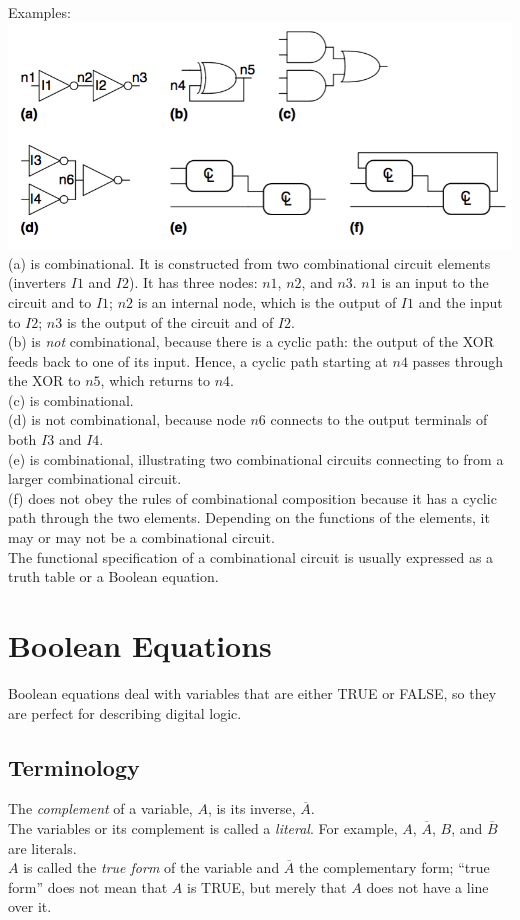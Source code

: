 \documentclass[12pt]{article}
\theoremstyle{definition}
\begin{document}
  Examples: \\
  \includegraphics{pictures/combinationalCircuitExample.png}
  (a) is combinational. It is constructed from two combinational circuit elements (inverters $I1$ and $I2$). It has three nodes: $n1$, $n2$, and $n3$. $n1$ is an input to the circuit and to $I1$; $n2$ is an internal node, which is the output of $I1$ and the input to $I2$; $n3$ is the output of the circuit and of $I2$. \\
  (b) is \emph{not} combinational, because there is a cyclic path: the output of the XOR feeds back to one of its input. Hence, a cyclic path starting at $n4$ passes through the XOR to $n5$, which returns to $n4$. \\
  (c) is combinational. \\
  (d) is not combinational, because node $n6$ connects to the output terminals of both $I3$ and $I4$. \\
  (e) is combinational, illustrating two combinational circuits connecting to from a larger combinational circuit. \\
  (f) does not obey the rules of combinational composition because it has a cyclic path through the two elements. Depending on the functions of the elements, it may or may not be a combinational circuit. \\

  The functional specification of a combinational circuit is usually expressed as a truth table or a Boolean equation.

  \newpage
  \section{Boolean Equations}
  Boolean equations deal with variables that are either TRUE or FALSE, so they are perfect for describing digital logic.

  \subsection{Terminology}
  The \emph{complement} of a variable, $A$, is its inverse, $\overline{A}$. \\
  The variables or its complement is called a \emph{literal}.
  For example, $A$, $\overline{A}$, $B$, and $\overline{B}$ are literals. \\
  $A$ is called the \emph{true form} of the variable and $\overline{A}$ the complementary form; ``true form'' does not mean that $A$ is TRUE, but merely that $A$ does not have a line over it. \\
\end{document}
